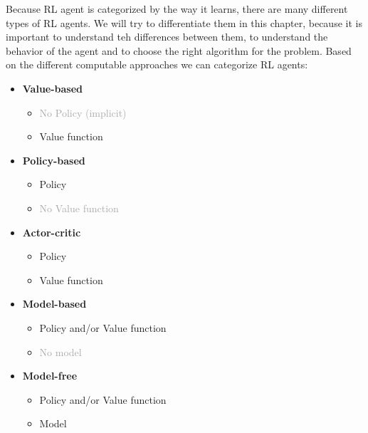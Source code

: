 \documentclass[../xlapes02]{subfiles}
\begin{document}
    Because RL agent is categorized by the way it learns, there are many different types of RL agents. We will try to differentiate them in this chapter, because it is important to understand teh differences between them, to understand the behavior of the agent and to choose the right algorithm for the problem. Based on the different computable approaches we can categorize RL agents:
    \begin{multicols}{2}
        \begin{itemize}
            \item \textbf{Value-based}
            \begin{itemize}
                \item \textcolor{darkgray}{No Policy (implicit)}
                \item Value function
            \end{itemize}
            \item \textbf{Policy-based}
            \begin{itemize}
                \item Policy
                \item \textcolor{darkgray}{No Value function}
            \end{itemize}
            \item \textbf{Actor-critic}
            \begin{itemize}
                \item Policy
                \item Value function
            \end{itemize}
        \end{itemize}
        \columnbreak
        \begin{itemize}
            \item \textbf{Model-based}
            \begin{itemize}
                \item Policy and/or Value function
                \item \textcolor{darkgray}{No model}
            \end{itemize}
            \item \textbf{Model-free}
            \begin{itemize}
                \item Policy and/or Value function
                \item Model
            \end{itemize}
        \end{itemize}
    \end{multicols}
\end{document}
